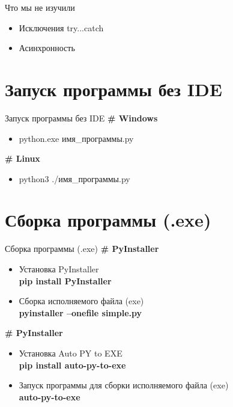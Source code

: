 \documentclass[12pt]{beamer}
\begin{document}
\begin{frame}{Что мы не изучили}
\begin{itemize}
\item Исключения try...catch
\item Асинхронность
\end{itemize}
\end{frame}


\section{Запуск программы без IDE}
\begin{frame}{Запуск программы без IDE}
\textbf{\# Windows} 
\begin{itemize}
\item python.exe имя\_программы.py
\end{itemize}
\vspace{0.3cm}
\textbf{\# Linux} 
\begin{itemize}
\item python3 ./имя\_программы.py
\end{itemize}
\end{frame}

\section{Сборка программы (.exe)}
\begin{frame}{Сборка программы (.exe)}
\textbf{\# PyInstaller} 
\begin{itemize}
\item Установка PyInstaller \\
	\textbf{pip install PyInstaller }
\item Сборка исполняемого файла (exe) \\
	\textbf{pyinstaller --onefile simple.py}
\end{itemize}
\vspace{0.3cm}
\textbf{\# PyInstaller} 
\begin{itemize}
\item Установка Auto PY to EXE \\
	\textbf{pip install auto-py-to-exe }
\item Запуск программы для сборки исполняемого файла (exe) \\
	\textbf{auto-py-to-exe}
\end{itemize}
\end{frame}
\end{document}
